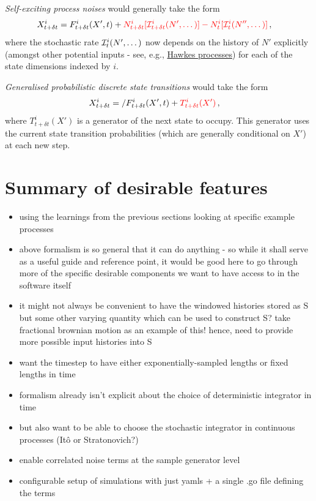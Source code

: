 \documentclass[sts]{imsart}
\begin{document}
\emph{Self-exciting process noises} would generally take the form
\begin{align}
& X^i_{t+\delta t} = F^i_{t+\delta t}(X', t) + \textcolor{red}{N^i_{t+\delta t}[{\cal I}^i_{t+\delta t}(N', \dots)]-N^i_{t}[{\cal I}^i_{t}(N'', \dots)]}\,,
\end{align}
where the stochastic rate ${\cal I}^i_{t}(N', \dots)$ now depends on the history of $N'$ explicitly (amongst other potential inputs - see, e.g., \href{https://en.wikipedia.org/wiki/Hawkes_process}{Hawkes processes}) for each of the state dimensions indexed by $i$.

\emph{Generalised probabilistic discrete state transitions} would take the form
\begin{align}
& X^i_{t+\delta t} = \slash{F^i_{t+\delta t}(X', t)} + \textcolor{red}{T^i_{t+\delta t}(X')}\,,
\end{align}
where $T^i_{t+\delta t}(X')$ is a generator of the next state to occupy. This generator uses the current state transition probabilities (which are generally conditional on $X'$) at each new step.

\section*{Summary of desirable features}

\begin{itemize}
\item{using the learnings from the previous sections looking at specific example processes}
\item{above formalism is so general that it can do anything - so while it shall serve as a useful guide and reference point, it would be good here to go through more of the specific desirable components we want to have access to in the software itself}
\item{it might not always be convenient to have the windowed histories stored as S but some other varying quantity which can be used to construct S? take fractional brownian motion as an example of this! hence, need to provide more possible input histories into S}
\item{want the timestep to have either exponentially-sampled lengths or fixed lengths in time}
\item{formalism already isn't explicit about the choice of deterministic integrator in time}
\item{but also want to be able to choose the stochastic integrator in continuous processes (Itô or Stratonovich?)}
\item{enable correlated noise terms at the sample generator level}
\item{configurable setup of simulations with just yamls + a single .go file defining the terms}
\end{itemize}
\end{document}
